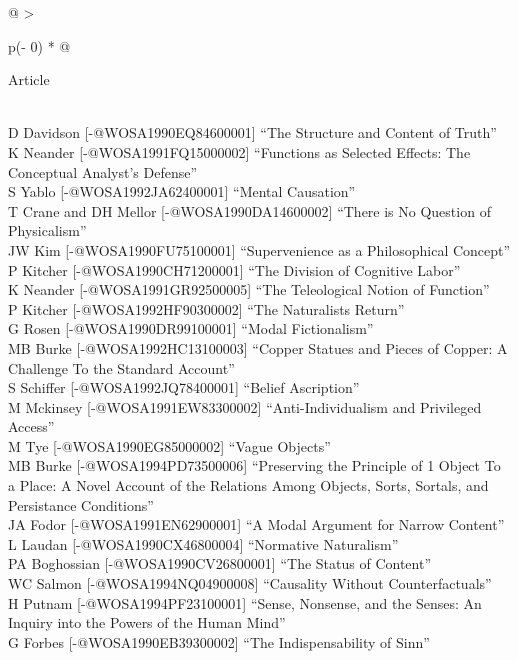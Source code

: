 \documentclass[
  10pt,
  letterpaper,
  DIV=11,
  numbers=noendperiod,
  twoside]{scrartcl}
\begin{document}
\begin{longtable}[]{@{}
  >{\raggedright\arraybackslash}p{(\columnwidth - 0\tabcolsep) * }@{}}

\caption{\label{tbl-early-1990s}The twenty articles from 1990-1994 most
widely cited at the time.}

\tabularnewline

\toprule\noalign{}
\begin{minipage}[b]{\linewidth}\raggedright
Article
\end{minipage} \\
\midrule\noalign{}
\endhead
\bottomrule\noalign{}
\endlastfoot
D Davidson {[}-@WOSA1990EQ84600001{]} ``The Structure and Content of
Truth'' \\
K Neander {[}-@WOSA1991FQ15000002{]} ``Functions as Selected Effects:
The Conceptual Analyst's Defense'' \\
S Yablo {[}-@WOSA1992JA62400001{]} ``Mental Causation'' \\
T Crane and DH Mellor {[}-@WOSA1990DA14600002{]} ``There is No Question
of Physicalism'' \\
JW Kim {[}-@WOSA1990FU75100001{]} ``Supervenience as a Philosophical
Concept'' \\
P Kitcher {[}-@WOSA1990CH71200001{]} ``The Division of Cognitive
Labor'' \\
K Neander {[}-@WOSA1991GR92500005{]} ``The Teleological Notion of
Function'' \\
P Kitcher {[}-@WOSA1992HF90300002{]} ``The Naturalists Return'' \\
G Rosen {[}-@WOSA1990DR99100001{]} ``Modal Fictionalism'' \\
MB Burke {[}-@WOSA1992HC13100003{]} ``Copper Statues and Pieces of
Copper: A Challenge To the Standard Account'' \\
S Schiffer {[}-@WOSA1992JQ78400001{]} ``Belief Ascription'' \\
M Mckinsey {[}-@WOSA1991EW83300002{]} ``Anti-Individualism and
Privileged Access'' \\
M Tye {[}-@WOSA1990EG85000002{]} ``Vague Objects'' \\
MB Burke {[}-@WOSA1994PD73500006{]} ``Preserving the Principle of 1
Object To a Place: A Novel Account of the Relations Among Objects,
Sorts, Sortals, and Persistance Conditions'' \\
JA Fodor {[}-@WOSA1991EN62900001{]} ``A Modal Argument for Narrow
Content'' \\
L Laudan {[}-@WOSA1990CX46800004{]} ``Normative Naturalism'' \\
PA Boghossian {[}-@WOSA1990CV26800001{]} ``The Status of Content'' \\
WC Salmon {[}-@WOSA1994NQ04900008{]} ``Causality Without
Counterfactuals'' \\
H Putnam {[}-@WOSA1994PF23100001{]} ``Sense, Nonsense, and the Senses:
An Inquiry into the Powers of the Human Mind'' \\
G Forbes {[}-@WOSA1990EB39300002{]} ``The Indispensability of Sinn'' \\

\end{longtable}
\end{document}
